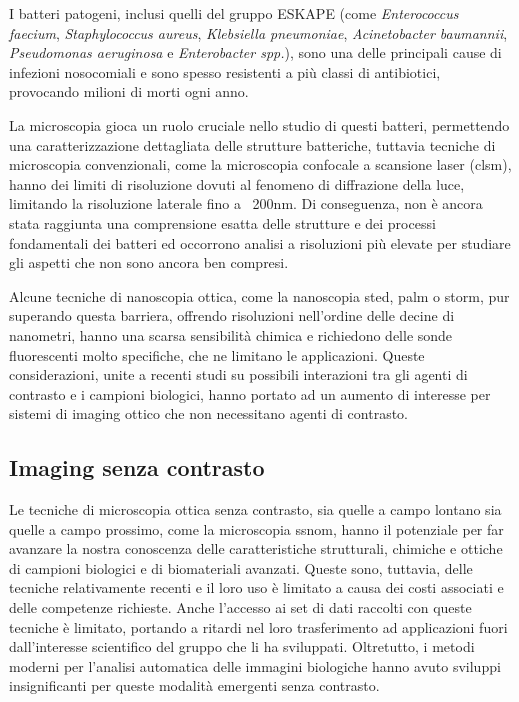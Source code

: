 \documentclass[../main.tex]{subfiles}
\begin{document}
I batteri patogeni, inclusi quelli del gruppo ESKAPE (come \textit{Enterococcus faecium}, \textit{Staphylococcus aureus}, \textit{Klebsiella pneumoniae}, \textit{Acinetobacter baumannii}, \textit{Pseudomonas aeruginosa} e \textit{Enterobacter spp.}), sono una delle principali cause di infezioni nosocomiali e sono spesso resistenti a più classi di antibiotici, provocando milioni di morti ogni anno.\cite{tacconelli_2018,rice_2010,pendleton_2013}

La microscopia gioca un ruolo cruciale nello studio di questi batteri, permettendo una caratterizzazione dettagliata delle strutture batteriche, tuttavia tecniche di microscopia convenzionali, come la microscopia confocale a scansione laser (\acrshort{clsm}), hanno dei limiti di risoluzione dovuti al fenomeno di diffrazione della luce, limitando la risoluzione laterale fino a ~200nm.
Di conseguenza, non è ancora stata raggiunta una comprensione esatta delle strutture e dei processi fondamentali dei batteri ed occorrono analisi a risoluzioni più elevate per studiare gli aspetti che non sono ancora ben compresi.

Alcune tecniche di nanoscopia ottica, come la nanoscopia \acrshort{sted}, \acrshort{palm} o \acrshort{storm}, pur superando questa barriera, offrendo risoluzioni nell'ordine delle decine di nanometri, hanno una scarsa sensibilità chimica e richiedono delle sonde fluorescenti molto specifiche, che ne limitano le applicazioni.
Queste considerazioni, unite a recenti studi su possibili interazioni tra gli agenti di contrasto e i campioni biologici\cite{cosentino_2019}, hanno portato ad un aumento di interesse per sistemi di imaging ottico che non necessitano agenti di contrasto.

\subsection{Imaging senza contrasto}

Le tecniche di microscopia ottica senza contrasto, sia quelle a campo lontano sia quelle a campo prossimo, come la microscopia \acrshort{ssnom}, hanno il potenziale per far avanzare la nostra  conoscenza delle caratteristiche strutturali, chimiche e ottiche di campioni biologici e di biomateriali avanzati. Queste sono, tuttavia, delle tecniche relativamente recenti e il loro uso è limitato a causa dei costi associati e delle competenze richieste.
Anche l'accesso ai set di dati raccolti con queste tecniche è limitato, portando a ritardi nel loro trasferimento ad applicazioni fuori dall'interesse scientifico del gruppo che li ha sviluppati. Oltretutto, i metodi moderni per l'analisi automatica delle immagini biologiche hanno avuto sviluppi insignificanti per queste modalità emergenti senza contrasto.
\end{document}
